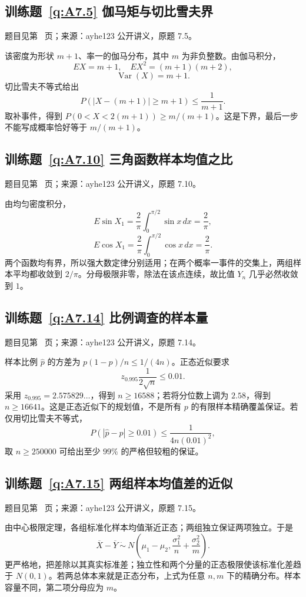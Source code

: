 \subsection*{训练题~\ref{q:A7.5} 伽马矩与切比雪夫界}\label{a:A7.5}{\small 题目见第~\pageref{q:A7.5} 页；来源：ayhe123 公开讲义，原题 7.5。}
\begin{solve}该密度为形状 $m+1$、率一的伽马分布，其中 $m$ 为非负整数。由伽马积分，\[EX=m+1,\quad EX^2=(m+1)(m+2),\]\[\operatorname{Var}(X)=m+1.\]切比雪夫不等式给出\[P(|X-(m+1)|\ge m+1)\le\frac1{m+1}.\]取补事件，得到 $P(0<X<2(m+1))\ge m/(m+1)$。这是下界，最后一步不能写成概率恰好等于 $m/(m+1)$。\end{solve}

\subsection*{训练题~\ref{q:A7.10} 三角函数样本均值之比}\label{a:A7.10}{\small 题目见第~\pageref{q:A7.10} 页；来源：ayhe123 公开讲义，原题 7.10。}
\begin{solve}由均匀密度积分，\[E\sin X_1=\frac2\pi\int_0^{\pi/2}\sin x\,dx=\frac2\pi,\]\[E\cos X_1=\frac2\pi\int_0^{\pi/2}\cos x\,dx=\frac2\pi.\]两个函数均有界，所以强大数定律分别适用；在两个概率一事件的交集上，两组样本平均都收敛到 $2/\pi$。分母极限非零，除法在该点连续，故比值 $Y_n$ 几乎必然收敛到 $1$。\end{solve}

\subsection*{训练题~\ref{q:A7.14} 比例调查的样本量}\label{a:A7.14}{\small 题目见第~\pageref{q:A7.14} 页；来源：ayhe123 公开讲义，原题 7.14。}
\begin{solve}样本比例 $\widehat p$ 的方差为 $p(1-p)/n\le1/(4n)$。正态近似要求\[z_{0.995}\frac{1}{2\sqrt n}\le0.01.\]采用 $z_{0.995}=2.575829\ldots$，得到 $n\ge16588$；若将分位数上调为 $2.58$，得到 $n\ge16641$。这是正态近似下的规划值，不是所有 $p$ 的有限样本精确覆盖保证。若仅用切比雪夫不等式，\[P(|\widehat p-p|\ge0.01)\le\frac{1}{4n(0.01)^2},\]取 $n\ge250000$ 可给出至少 $99\%$ 的严格但较粗的保证。\end{solve}

\subsection*{训练题~\ref{q:A7.15} 两组样本均值差的近似}\label{a:A7.15}{\small 题目见第~\pageref{q:A7.15} 页；来源：ayhe123 公开讲义，原题 7.15。}
\begin{solve}由中心极限定理，各组标准化样本均值渐近正态；两组独立保证两项独立。于是\[\overline X-\overline Y\ \dot\sim\ N\left(\mu_1-\mu_2,\frac{\sigma_1^2}{n}+\frac{\sigma_2^2}{m}\right).\]更严格地，把差除以其真实标准差；独立性和两个分量的正态极限使该标准化差趋于 $N(0,1)$。若两总体本来就是正态分布，上式为任意 $n,m$ 下的精确分布。样本容量不同，第二项分母应为 $m$。\end{solve}

